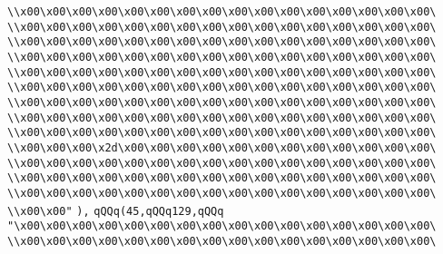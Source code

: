 \verb|\\x00\x00\x00\x00\x00\x00\x00\x00\x00\x00\x00\x00\x00\x00\x00\x00\|\newline
\verb|\\x00\x00\x00\x00\x00\x00\x00\x00\x00\x00\x00\x00\x00\x00\x00\x00\|\newline
\verb|\\x00\x00\x00\x00\x00\x00\x00\x00\x00\x00\x00\x00\x00\x00\x00\x00\|\newline
\verb|\\x00\x00\x00\x00\x00\x00\x00\x00\x00\x00\x00\x00\x00\x00\x00\x00\|\newline
\verb|\\x00\x00\x00\x00\x00\x00\x00\x00\x00\x00\x00\x00\x00\x00\x00\x00\|\newline
\verb|\\x00\x00\x00\x00\x00\x00\x00\x00\x00\x00\x00\x00\x00\x00\x00\x00\|\newline
\verb|\\x00\x00\x00\x00\x00\x00\x00\x00\x00\x00\x00\x00\x00\x00\x00\x00\|\newline
\verb|\\x00\x00\x00\x00\x00\x00\x00\x00\x00\x00\x00\x00\x00\x00\x00\x00\|\newline
\verb|\\x00\x00\x00\x00\x00\x00\x00\x00\x00\x00\x00\x00\x00\x00\x00\x00\|\newline
\verb|\\x00\x00\x00\x2d\x00\x00\x00\x00\x00\x00\x00\x00\x00\x00\x00\x00\|\newline
\verb|\\x00\x00\x00\x00\x00\x00\x00\x00\x00\x00\x00\x00\x00\x00\x00\x00\|\newline
\verb|\\x00\x00\x00\x00\x00\x00\x00\x00\x00\x00\x00\x00\x00\x00\x00\x00\|\newline
\verb|\\x00\x00\x00\x00\x00\x00\x00\x00\x00\x00\x00\x00\x00\x00\x00\x00\|\newline
\verb|\\x00\x00"|\newline
\verb|),|\newline
\verb|qQQq(45,qQQq129,qQQq|\newline
\verb|"\x00\x00\x00\x00\x00\x00\x00\x00\x00\x00\x00\x00\x00\x00\x00\x00\|\newline
\verb|\\x00\x00\x00\x00\x00\x00\x00\x00\x00\x00\x00\x00\x00\x00\x00\x00\|\newline
